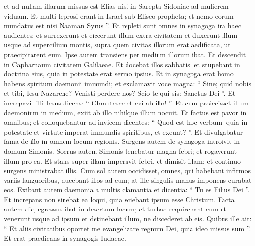 \begin{biblechapter}
\begin{biblechapter}
\begin{biblechapter}
\begin{biblechapter}
\verse et ad nullam illarum missus est Elias nisi in Sarepta Sidoniae ad mulierem viduam. 
 \verse Et multi leprosi erant in Israel sub Eliseo propheta; et nemo eorum mundatus est nisi Naaman Syrus ”.
 \verse Et repleti sunt omnes in synagoga ira haec audientes; 
\verse et surrexerunt et eiecerunt illum extra civitatem et duxerunt illum usque ad supercilium montis, supra quem civitas illorum erat aedificata, ut praecipitarent eum. 
 \verse Ipse autem transiens per medium illorum ibat.
 \verse Et descendit in Capharnaum civitatem Galilaeae. Et docebat illos sabbatis; 
 \verse et stupebant in doctrina eius, quia in potestate erat sermo ipsius. 
\verse Et in synagoga erat homo habens spiritum daemonii immundi; et exclamavit voce magna: 
\verse “ Sine; quid nobis et tibi, Iesu Nazarene? Venisti perdere nos? Scio te qui sis: Sanctus Dei ”. 
\verse Et increpavit illi Iesus dicens: “ Obmutesce et exi ab illo! ”. Et cum proiecisset illum daemonium in medium, exiit ab illo nihilque illum nocuit. 
\verse Et factus est pavor in omnibus; et colloquebantur ad invicem dicentes: “ Quod est hoc verbum, quia in potestate et virtute imperat immundis spiritibus, et exeunt? ”. 
\verse Et divulgabatur fama de illo in omnem locum regionis.
 \verse Surgens autem de synagoga introivit in domum Simonis. Socrus autem Simonis tenebatur magna febri; et rogaverunt illum pro ea. 
\verse Et stans super illam imperavit febri, et dimisit illam; et continuo surgens ministrabat illis.
 \verse Cum sol autem occidisset, omnes, qui habebant infirmos variis languoribus, ducebant illos ad eum; at ille singulis manus imponens curabat eos. 
\verse Exibant autem daemonia a multis clamantia et dicentia: “ Tu es Filius Dei ”. Et increpans non sinebat ea loqui, quia sciebant ipsum esse Christum. 
\verse Facta autem die, egressus ibat in desertum locum; et turbae requirebant eum et venerunt usque ad ipsum et detinebant illum, ne discederet ab eis. 
\verse Quibus ille ait: “ Et aliis civitatibus oportet me evangelizare regnum Dei, quia ideo missus sum ”. 
\verse Et erat praedicans in synagogis Iudaeae.
 

\end{biblechapter}
\end{biblechapter}
\end{biblechapter}
\end{biblechapter}
